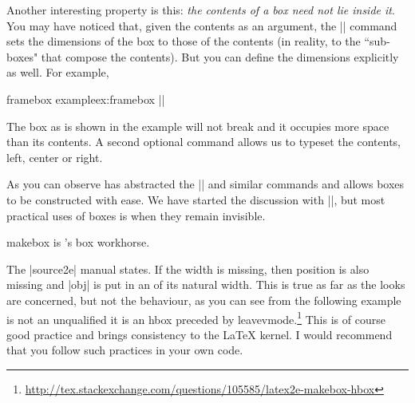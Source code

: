 {Another interesting property is this: \emph{the contents of a box need not lie inside it}. You may have
noticed that, given the contents as an argument, the
|\framebox| command sets the dimensions of the box
to those of the contents (in reality, to the ``sub-boxes"
that compose the contents). But you can define the
dimensions explicitly as well. For example,

\begin{texexample}{framebox example}{ex:framebox}
||



\end{texexample}

The box as is shown in the example will not break and it occupies more space than its contents. A second optional command allows us to typeset the contents, left, center or right.

\begin{codeexample}[vbox]

\par

\par

\par

\par

\par

\par
\end{codeexample}

As you can observe \latexe has abstracted the |\hfill| and similar commands and allows boxes to be constructed with ease. We have started the discussion with |\framebox|, but most practical uses of boxes is when they remain invisible.

\begin{docCommand}{makebox} {  } 
 is \latex's box workhorse.
 \end{docCommand}

The |source2e| manual states. If the width is missing, then position is also missing and |obj|  is put in an  of its natural width. This is true as far as the looks are concerned, but not the behaviour, as you can see
from the following example is not an unqualified \cmd{\hbox} it is an hbox preceded by leavevmode.\footnote{\url{http://tex.stackexchange.com/questions/105585/latex2e-makebox-hbox}} This is of course good practice and brings consistency to the LaTeX kernel. I would recommend that you follow such practices in your own code. 

}
